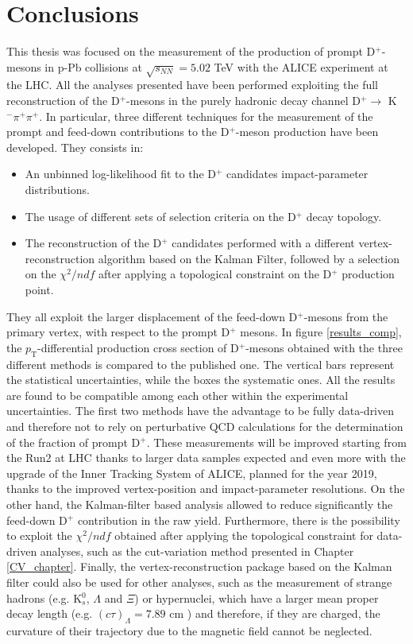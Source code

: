 \documentclass[b5paper,10pt,twoside,oldstyle,classica]{toptesi}
\newcommand{\pt}{p_\text{T}}
\begin{document}
\chapter{Conclusions}
This thesis was focused on the measurement of the production of prompt D$^+$-mesons in p-Pb collisions at $\sqrt{s_{NN}}=5.02$ TeV with the ALICE experiment at the LHC. All the analyses presented have been performed exploiting the full reconstruction of the D$^+$-mesons in the purely hadronic decay channel D$^+\rightarrow$ K$^-\pi^+\pi^+$. In particular, three different techniques for the measurement of the prompt and feed-down contributions to the D$^+$-meson production have been developed. They consists in:  
\begin{itemize}
 \item An unbinned log-likelihood fit to the D$^+$ candidates impact-parameter distributions.
 \item The usage of different sets of selection criteria on the D$^+$ decay topology.
 \item The reconstruction of the D$^+$ candidates performed with a different vertex-reconstruction algorithm based on the Kalman Filter, followed by a selection on the $\chi^2/ndf$ after applying a topological constraint on the D$^+$ production point.  
\end{itemize}
They all exploit the larger displacement of the feed-down D$^+$-mesons from the primary vertex, with respect to the prompt D$^+$ mesons.
In figure \ref{results_comp}, the $\pt$-differential production cross section of D$^+$-mesons obtained with the three different methods is compared to the published one. The vertical bars represent the statistical uncertainties, while the boxes the systematic ones. All the results are found to be compatible among each other within the experimental uncertainties. The first two methods have the advantage to be fully data-driven and therefore not to rely on perturbative QCD calculations for the determination of the fraction of prompt D$^+$. These measurements will be improved starting from the Run2 at LHC thanks to larger data samples expected and even more with the upgrade of the Inner Tracking System of ALICE, planned for the year 2019, thanks to the improved vertex-position and impact-parameter resolutions. On the other hand, the Kalman-filter based analysis allowed to reduce significantly the feed-down D$^+$ contribution in the raw yield. Furthermore, there is the possibility to exploit the $\chi^2/ndf$ obtained after applying the topological constraint for data-driven analyses, such as the cut-variation method presented in Chapter \ref{CV_chapter}. Finally, the vertex-reconstruction package based on the Kalman filter could also be used for other analyses, such as the measurement of strange hadrons (e.g. K$_s^0$, $\Lambda$ and $\Xi$) or hypernuclei, which have a larger mean proper decay length (e.g. $(c\tau)_{\Lambda}=7.89$ cm \cite{Agashe:2014kda}) and therefore, if they are charged, the curvature of their trajectory due to the magnetic field cannot be neglected.  
\end{document}
